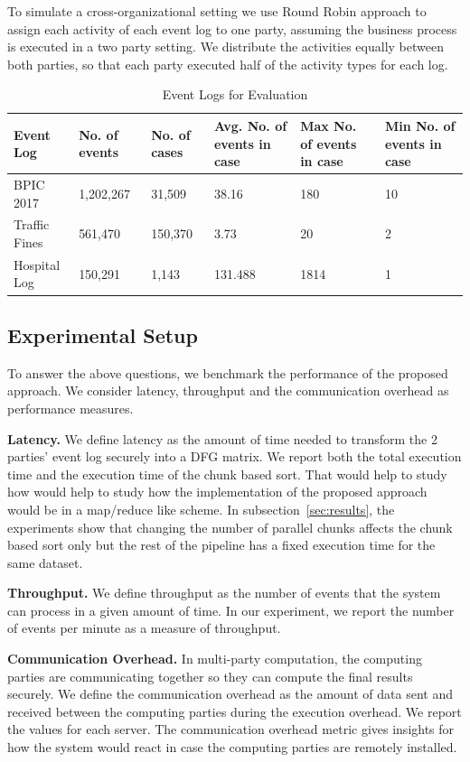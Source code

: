 To simulate  a cross-organizational setting we use Round Robin approach to assign each activity of each event log  to one party, assuming the business process is executed in a two party setting. We distribute the activities equally between both parties, so that each party executed half of the activity types for each log.

\begin{table}[!ht]
	
	\begin{tabularx}{\textwidth}{ X X X X X X}\\
		\toprule
		Event Log &No. of events &No. of cases & Avg. No. of events in case &Max No. of events in case & Min No. of events in case \\
		\midrule
		BPIC 2017 &		1,202,267 &	 31,509 & 38.16& 180 & 10\\
		Traffic Fines &	 561,470 & 	150,370 & 3.73& 20 & 2\\
		Hospital Log &	 150,291 &	 1,143 & 131.488 & 1814 & 1\\
		\bottomrule
	\end{tabularx}
	\caption{Event Logs for Evaluation}
	\label{tab:event_logs}
\end{table}

\subsection{Experimental Setup}
\label{sec:exp_setup}
To answer the above questions, we benchmark the performance of the proposed approach. We consider latency, throughput and the communication overhead as performance measures. 

\textbf{Latency.} We define latency as the amount of time needed to transform the 2 parties' event log securely into a DFG matrix. We report both the total execution time and the execution time of the chunk based sort. That would help to study how would help to study how the implementation of the proposed approach would be in a map/reduce like scheme. In subsection~\ref{sec:results}, the experiments show that changing the number of parallel chunks affects the chunk based sort only but the rest of the pipeline has a fixed execution time for the same dataset.

\textbf{Throughput.} We define throughput as the number of events that the system can process in a given amount of time. In our experiment, we report the number of events per minute as a measure of throughput.

\textbf{Communication Overhead.} In multi-party computation, the computing parties are communicating together so they can compute the final results securely. We define the communication overhead as the amount of data sent and received between the computing parties during the execution overhead. We report the values for each server. The communication overhead metric gives insights for how the system  would react in case the computing parties are remotely installed.

